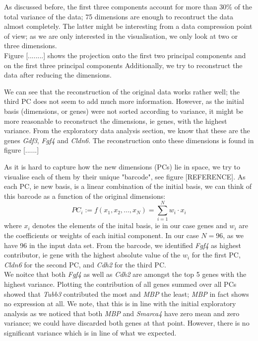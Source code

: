 As discussed before, the first three components account for more than 30\% of the total variance of the data; 75 dimensions are enough to recontruct the data almost completely. The latter might be interesting from a data compression point of view; as we are only interested in the visualisation, we only look at two or three dimensions.\\

Figure [........] shows the projection onto the first two principal components and on the first three principal components 
Additionally, we try to reconstruct the data after reducing the dimensions. 

We can see that the reconstruction of the original data works rather well; the third PC does not seem to add much more information.
However, as the initial basis (dimensions, or genes) were not sorted according to variance, it might be more reasonable to reconstruct the dimensions, ie genes, with the highest variance. From the exploratory data analysis section, we know that these are the genes \textit{Gdf3}, \textit{Fgf4} and \textit{Cldn6}. The reconstruction onto these dimensions is found in figure [......]

As it is hard to capture how the new dimensions (PCs) lie in space, we try to visualise each of them by their unique "barcode", see figure [REFERENCE]. As each PC, ie new basis, is a linear combination of the initial basis, we can think of this barcode as a function of the original dimensions:
\begin{equation}
	PC_{i}  := f(x_{1}, x_{2}, ..., x_{N}) = \sum_{i=1}^{N} w_{i} \cdot x_{i}
\end{equation}
where \( x_{i} \) denotes the elements of the inital basis, ie in our case genes and \( w_{i} \) are the coefficients or weights of each initial component. In our case \( N = 96 \), as we have 96 in the input data set. From the barcode, we identified \textit{Fgf4} as highest contributor, ie gene with the highest absolute value of the \( w_{i} \) for the first PC, \textit{Cldn6} for the second PC, and \textit{Cdh2} for the third PC. \\
We noitce that both \textit{Fgf4} as well as \textit{Cdh2} are amongst the top 5 genes with the highest variance. 
Plotting the contribution of all genes summed over all PCs showed that \textit{Tubb3} contributed the most and \textit{MBP} the least; \textit{MBP} in fact shows no expression at all. We note, that this is in line with the initial exploratory analysis as we noticed that both \textit{MBP} and \textit{Smarca4} have zero mean and zero variance; we could have discarded both genes at that point.
However, there is no significant variance which is in line of what we expected.


